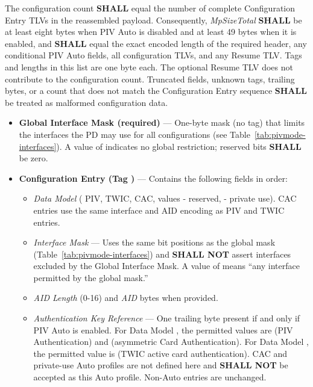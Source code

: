 The configuration count \textbf{SHALL} equal the number of complete Configuration Entry
TLVs in the reassembled payload. Consequently, \emph{MpSizeTotal} \textbf{SHALL} be at
least eight bytes when PIV Auto is disabled and at least 49 bytes when it is enabled, and
\textbf{SHALL} equal the exact encoded length of the required header, any conditional PIV
Auto fields, all configuration TLVs, and any Resume TLV. Tags and lengths in this list
are one byte each. The optional Resume TLV does not contribute to the configuration count.
Truncated fields, unknown tags, trailing bytes, or a count that does not match the
Configuration Entry sequence \textbf{SHALL} be treated as malformed configuration data.

\begin{itemize}
  \item \textbf{Global Interface Mask (required)} — One-byte mask (no tag) that limits the interfaces the PD may use for all configurations (see Table~\ref{tab:pivmode-interfaces}). A value of  indicates no global restriction; reserved bits \textbf{SHALL} be zero.
  \item \textbf{Configuration Entry (Tag )} — Contains the following fields in order:
    \begin{itemize}
      \item \emph{Data Model} ( PIV,  TWIC,  CAC, values - reserved, - private use). CAC entries use the same interface and AID encoding as PIV and TWIC entries.
      \item \emph{Interface Mask} — Uses the same bit positions as the global mask (Table~\ref{tab:pivmode-interfaces}) and \textbf{SHALL NOT} assert interfaces excluded by the Global Interface Mask. A value of  means “any interface permitted by the global mask.”
      \item \emph{AID Length} (0-16) and \emph{AID} bytes when provided.
      \item \emph{Authentication Key Reference} — One trailing byte present if and only if
        PIV Auto is enabled. For Data Model , the permitted values are
         (PIV Authentication) and  (asymmetric Card Authentication).
        For Data Model , the permitted value is  (TWIC active card
        authentication). CAC and private-use Auto profiles are not defined here and
        \textbf{SHALL NOT} be accepted as this Auto profile. Non-Auto entries are unchanged.
    \end{itemize}
\end{itemize}


